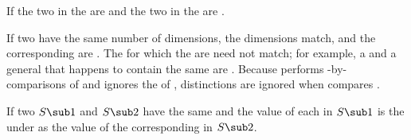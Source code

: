 
If the two  in the  are  
and the two  in the  are .


If two  have the same
number of dimensions, the dimensions match,
and the corresponding
are .
The  for which the  are  need not match; 
for example, a  and a general  that happens to contain the same 
 are .
Because  performs -by- comparisons
of  and ignores the  of ,
 distinctions are ignored when  compares .

% 
% 
% 


% 
% 
% 
%
If two  $S\sub 1$ and $S\sub 2$ have the same 
and the value of each  in $S\sub 1$ is the  under 
as the value of the corresponding  in $S\sub 2$.

